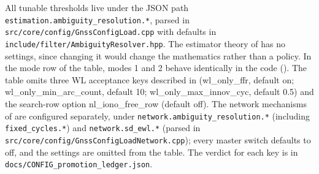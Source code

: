 \documentclass[main.tex]{subfiles}
\begin{document}
All tunable thresholds live under the JSON path
\texttt{estimation.ambiguity\_resolution.*}, parsed in
\texttt{src/core/config/GnssConfigLoad.cpp} with defaults in
\texttt{include/filter/AmbiguityResolver.hpp}.  The estimator theory of
 has no settings, since changing
it would change the mathematics rather than a policy.  In the
mode row of the table, modes 1 and 2 behave identically in the
code ().  The table omits three WL acceptance keys
described in  (wl\_only\_ffr, default on;
wl\_only\_min\_arc\_count, default 10; wl\_only\_max\_innov\_cyc, default
0.5) and the search-row option nl\_iono\_free\_row (default off).  The
network mechanisms of  are configured separately, under
\texttt{network.ambiguity\_resolution.*} (including
\texttt{fixed\_cycles.*}) and \texttt{network.sd\_ewl.*} (parsed in
\texttt{src/core/config/GnssConfigLoadNetwork.cpp}); every master switch
defaults to off, and the settings are omitted from the table.  The verdict
for each key is in \texttt{docs/CONFIG\_promotion\_ledger.json}.
\end{document}

